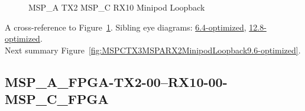 \begin{figure}[h]
\begin{subfigure}{0.33\textwidth}
\hyperref[sec:MSPAFPGATX206RX1006MSPCFPGA9.6-optimized]{}
\end{subfigure}\hspace*{\fill}
\begin{subfigure}{0.33\textwidth}
\hyperref[sec:MSPAFPGATX207RX1007MSPCFPGA9.6-optimized]{}
\end{subfigure}\hspace*{\fill}
\begin{subfigure}{0.33\textwidth}
\hyperref[sec:MSPAFPGATX208RX1008MSPCFPGA9.6-optimized]{}
\end{subfigure}

\begin{subfigure}{0.33\textwidth}
\hyperref[sec:MSPAFPGATX209RX1009MSPCFPGA9.6-optimized]{}
\end{subfigure}\hspace*{\fill}
\begin{subfigure}{0.33\textwidth}
\hyperref[sec:MSPAFPGATX210RX1010MSPCFPGA9.6-optimized]{}
\end{subfigure}\hspace*{\fill}
\begin{subfigure}{0.33\textwidth}
\hyperref[sec:MSPAFPGATX211RX1011MSPCFPGA9.6-optimized]{}
\end{subfigure}

\caption{MSP\_A TX2 MSP\_C RX10 Minipod Loopback} \label{fig:MSPATX2MSPCRX10MinipodLoopback9.6-optimized}
\end{figure}

A cross-reference to Figure~\ref{fig:MSPATX2MSPCRX10MinipodLoopback9.6-optimized}.
Sibling eye diagrams: \hyperref[sec:MSPATX2MSPCRX10MinipodLoopback6.4-optimized]{6.4-optimized}, \hyperref[sec:MSPATX2MSPCRX10MinipodLoopback12.8-optimized]{12.8-optimized}. \\
Next summary Figure~\ref{fig:MSPCTX3MSPARX2MinipodLoopback9.6-optimized}.
\clearpage
% 
\subsection{MSP\_A\_FPGA-TX2-00--RX10-00-MSP\_C\_FPGA}\label{sec:MSPAFPGATX200RX1000MSPCFPGA9.6-optimized}

